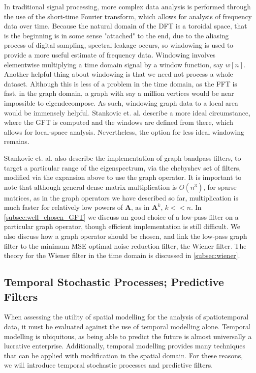 \documentclass[12pt,a4paper]{article} %
\begin{document}
In traditional signal processing, more complex data analysis is performed through the use of the short-time Fourier transform, which allows for analysis of frequency data over time. Because the natural domain of the DFT is a toroidal space, that is the beginning is in some sense "attached" to the end, due to the aliasing process of digital sampling, spectral leakage occurs, so windowing is used to provide a more useful estimate of frequency data. Windowing involves elementwise multiplying a time domain signal by a window function, say $w[n]$. Another helpful thing about windowing is that we need not process a whole dataset. Although this is less of a problem in the time domain, as the FFT is fast, in the graph domain, a graph with say a million vertices would be near impossible to eigendecompose. As such, windowing graph data to a local area would be immensely helpful. Stankovic et. al. describe a more ideal circumstance, where the GFT is computed and the windows are defined from there, which allows for local-space analysis. Nevertheless, the option for less ideal windowing remains.

Stankovic et. al. also describe the implementation of graph bandpass filters, to target a particular range of the eigenspectrum, via the chebyshev set of filters, modified via the expansion above to use the graph operator. It is important to note that although general dense matrix multiplication is $O(n^3)$, for sparse matrices, as in the graph operators we have described so far, multiplication is much faster for relatively low powers of $\pmb{A}$, as in $\pmb{A}^k$, $k<<n$. In \ref{subsec:well_chosen_GFT} we discuss an good choice of a low-pass filter on a particular graph operator, though efficient implementation is still difficult. We also discuss how a graph operator should be chosen, and link the low-pass graph filter to the minimum MSE optimal noise reduction filter, the Wiener filter. The theory for the Wiener filter in the time domain is discussed in \ref{subsec:wiener}.

\subsection{Temporal Stochastic Processes; Predictive Filters}
\label{subsec:temporal_processes}
When assessing the utility of spatial modelling for the analysis of spatiotemporal data, it must be evaluated against the use of temporal modelling alone. Temporal modelling is ubiquitous, as being able to predict the future is almost universally a lucrative enterprise. Additionally, temporal modelling provides many techniques that can be applied with modification in the spatial domain. For these reasons, we will introduce temporal stochastic processes and predictive filters.
\end{document}

